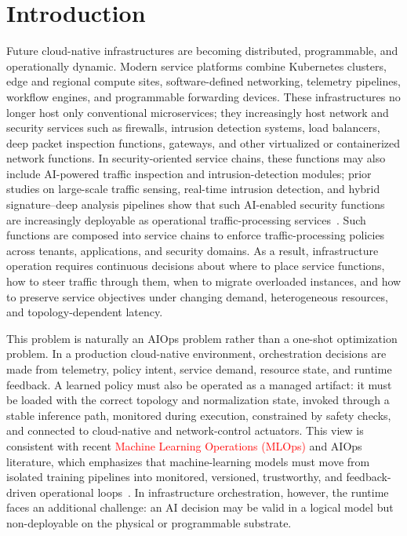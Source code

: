 \documentclass[final,5p]{elsarticle}
\newcommand{\rev}[1]{\textcolor{red}{#1}}
\begin{document}
\section{Introduction}
\label{sec:introduction}

Future cloud-native infrastructures are becoming distributed, programmable, and operationally dynamic. Modern service platforms combine Kubernetes clusters, edge and regional compute sites, software-defined networking, telemetry pipelines, workflow engines, and programmable forwarding devices. These infrastructures no longer host only conventional microservices; they increasingly host network and security services such as firewalls, intrusion detection systems, load balancers, deep packet inspection functions, gateways, and other virtualized or containerized network functions. In security-oriented service chains, these functions may also include AI-powered traffic inspection and intrusion-detection modules; prior studies on large-scale traffic sensing, real-time intrusion detection, and hybrid signature--deep analysis pipelines show that such AI-enabled security functions are increasingly deployable as operational traffic-processing services~\cite{cSDAID22}. Such functions are composed into service chains to enforce traffic-processing policies across tenants, applications, and security domains. As a result, infrastructure operation requires continuous decisions about where to place service functions, how to steer traffic through them, when to migrate overloaded instances, and how to preserve service objectives under changing demand, heterogeneous resources, and topology-dependent latency.

This problem is naturally an AIOps problem rather than a one-shot optimization problem. In a production cloud-native environment, orchestration decisions are made from telemetry, policy intent, service demand, resource state, and runtime feedback. A learned policy must also be operated as a managed artifact: it must be loaded with the correct topology and normalization state, invoked through a stable inference path, monitored during execution, constrained by safety checks, and connected to cloud-native and network-control actuators. This view is consistent with recent \rev{Machine Learning Operations (MLOps)} and AIOps literature, which emphasizes that machine-learning models must move from isolated training pipelines into monitored, versioned, trustworthy, and feedback-driven operational loops~\cite{kreuzberger2023mlops,diazdearcaya2024joint,eken2025mlops,bayram2025trustworthy,zhang2025aiopsllm,eramo2024architecture}. In infrastructure orchestration, however, the runtime faces an additional challenge: an AI decision may be valid in a logical model but non-deployable on the physical or programmable substrate.
\end{document}
